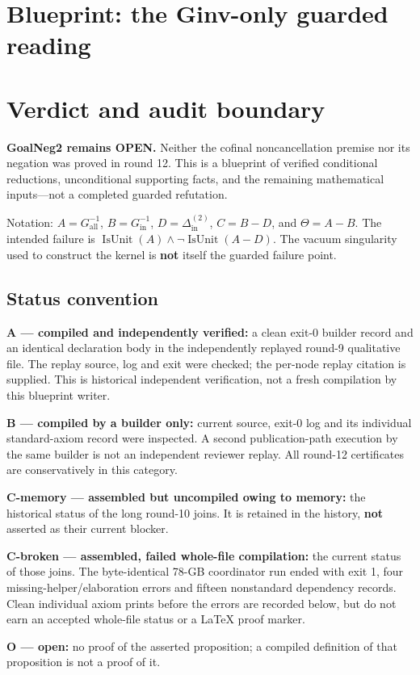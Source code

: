 \section{Blueprint: the Ginv-only guarded reading}

\section{Verdict and audit boundary}

\textbf{GoalNeg2 remains OPEN.} Neither the cofinal noncancellation premise nor its negation was proved in round 12. This is a blueprint of verified conditional reductions, unconditional supporting facts, and the remaining mathematical inputs—not a completed guarded refutation.

Notation: \(A=G^{-1}_{\mathrm{all}}\), \(B=G^{-1}_{\mathrm{in}}\), \(D=\Delta^{(2)}_{\mathrm{in}}\), \(C=B-D\), and \(\Theta=A-B\). The intended failure is \(\operatorname{IsUnit}(A)\land\neg\operatorname{IsUnit}(A-D)\). The vacuum singularity used to construct the kernel is \textbf{not} itself the guarded failure point.

\subsection{Status convention}

\par \textbf{A — compiled and independently verified:} a clean exit-0 builder record and an identical declaration body in the independently replayed round-9 qualitative file. The replay source, log and exit were checked; the per-node replay citation is supplied. This is historical independent verification, not a fresh compilation by this blueprint writer.
\par \textbf{B — compiled by a builder only:} current source, exit-0 log and its individual standard-axiom record were inspected. A second publication-path execution by the same builder is not an independent reviewer replay. All round-12 certificates are conservatively in this category.
\par \textbf{C-memory — assembled but uncompiled owing to memory:} the historical status of the long round-10 joins. It is retained in the history, \textbf{not} asserted as their current blocker.
\par \textbf{C-broken — assembled, failed whole-file compilation:} the current status of those joins. The byte-identical 78-GB coordinator run ended with exit 1, four missing-helper/elaboration errors and fifteen nonstandard dependency records. Clean individual axiom prints before the errors are recorded below, but do not earn an accepted whole-file status or a LaTeX proof marker.
\par \textbf{O — open:} no proof of the asserted proposition; a compiled definition of that proposition is not a proof of it.

